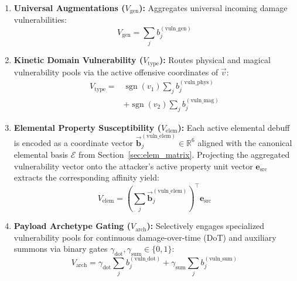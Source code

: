 \documentclass[twocolumn,10pt]{article}
\DeclareMathOperator{\sgn}{sgn}
\begin{document}
\begin{enumerate}
    \item \textbf{Universal Augmentations ($V_{\text{gen}}$):} Aggregates universal incoming damage vulnerabilities:
    \begin{equation}
    \label{eq:vuln_gen}
      V_{\text{gen}} = \sum_{j} b_j^{(\text{vuln\_gen})}
    \end{equation}

    \item \textbf{Kinetic Domain Vulnerability ($V_{\text{type}}$):} Routes physical and magical vulnerability pools via the active offensive coordinates of $\vec{v}$:
    \begin{equation}
    \label{eq:vuln_dt}
    \begin{split}
      V_{\text{type}} = {} & \sgn(v_1) \sum_{j} b_j^{(\text{vuln\_phys})} \\
      &+ \sgn(v_2) \sum_{j} b_j^{(\text{vuln\_mag})}
    \end{split}
    \end{equation}

    \item \textbf{Elemental Property Susceptibility ($V_{\text{elem}}$):} Each active elemental debuff is encoded as a coordinate vector $\vec{\mathbf{b}}_j^{(\text{vuln\_elem})} \in \mathbb{R}^6$ aligned with the canonical elemental basis $\mathcal{E}$ from Section~\ref{sec:elem_matrix}. Projecting the aggregated vulnerability vector onto the attacker's active property unit vector $\mathbf{e}_{\text{src}}$ extracts the corresponding affinity yield:
    \begin{equation}
    \label{eq:vuln_elem}
      V_{\text{elem}} = \left( \sum_{j} \vec{\mathbf{b}}_j^{(\text{vuln\_elem})} \right)^\top \mathbf{e}_{\text{src}}
    \end{equation}

    \item \textbf{Payload Archetype Gating ($V_{\text{arch}}$):} Selectively engages specialized vulnerability pools for continuous damage-over-time (DoT) and auxiliary summons via binary gates $\gamma_{\text{dot}}, \gamma_{\text{sum}} \in \{0, 1\}$:
    \begin{equation}
    \label{eq:vuln_archetype}
      V_{\text{arch}} = \gamma_{\text{dot}} \sum_{j} b_j^{(\text{vuln\_dot})} + \gamma_{\text{sum}} \sum_{j} b_j^{(\text{vuln\_sum})}
    \end{equation}
\end{enumerate}
\end{document}
